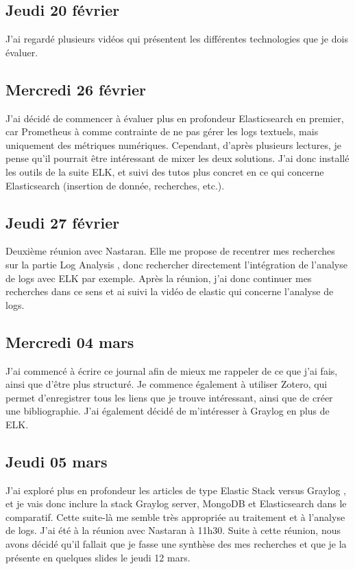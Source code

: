 \documentclass[paper=a4, fontsize=11pt]{scrartcl}
\begin{document}
\subsection{Jeudi 20 février}
    J'ai regardé plusieurs vidéos qui présentent les différentes technologies que je dois évaluer.
\subsection{Mercredi 26 février}
    J'ai décidé de commencer à évaluer plus en profondeur Elasticsearch en premier, car Prometheus à comme contrainte de ne pas gérer les logs textuels, mais uniquement des métriques numériques. Cependant, d'après plusieurs lectures, je pense qu'il pourrait être intéressant de mixer les deux solutions. J'ai donc installé les outils de la suite ELK, et suivi des tutos plus concret en ce qui concerne Elasticsearch (insertion de donnée, recherches, etc.).
\subsection{Jeudi 27 février}
    Deuxième réunion avec Nastaran. Elle me propose de recentrer mes recherches sur la partie \og Log Analysis \fg, donc rechercher directement l'intégration de l'analyse de logs avec ELK par exemple. Après la réunion, j'ai donc continuer mes recherches dans ce sens et ai suivi la vidéo de elastic qui concerne l'analyse de logs.
\subsection{Mercredi 04 mars}
    J'ai commencé à écrire ce journal afin de mieux me rappeler de ce que j'ai fais, ainsi que d'être plus structuré. Je commence également à utiliser Zotero, qui permet d'enregistrer tous les liens que je trouve intéressant, ainsi que de créer une bibliographie. J'ai également décidé de m'intéresser à Graylog en plus de ELK.
\subsection{Jeudi 05 mars}
    J'ai exploré plus en profondeur les articles de type \og Elastic Stack versus Graylog \fg, et je vais donc inclure la stack \og Graylog server, MongoDB et Elasticsearch \fg dans le comparatif. Cette suite-là me semble très appropriée au traitement et à l'analyse de logs.
    J'ai été à la réunion avec Nastaran à 11h30. Suite à cette réunion, nous avons décidé qu'il fallait que je fasse une synthèse des mes recherches et que je la présente en quelques slides le jeudi 12 mars.
\end{document}
